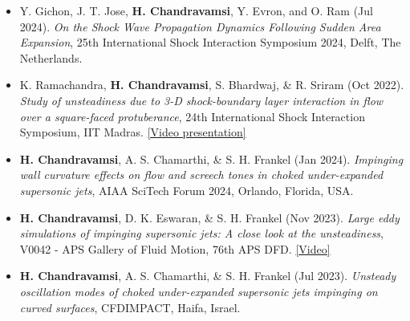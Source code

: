 \begin{itemize}[itemsep=0pt, topsep=0pt, label=]
    \item Y. Gichon, J. T. Jose, \textbf{H. Chandravamsi}, Y. Evron, and O. Ram (Jul 2024). \textit{On the Shock Wave Propagation Dynamics Following Sudden Area Expansion}, 25th International Shock Interaction Symposium 2024, Delft, The Netherlands.
\end{itemize}

\begin{itemize}[itemsep=0pt, topsep=0pt, label=]
    \item K. Ramachandra, \textbf{H. Chandravamsi}, S. Bhardwaj, \& R. Sriram (Oct 2022). \textit{Study of unsteadiness due to 3-D shock-boundary layer interaction in flow over a square-faced protuberance}, 24th International Shock Interaction Symposium, IIT Madras. \href{https://youtube.com/live/phs5VvR6Ksk?si=EnSIkaIECMiOmarE&t=9944}{[Video presentation]}
\end{itemize}

\begin{itemize}[itemsep=0pt, topsep=0pt, label=]
    \item \textbf{H. Chandravamsi}, A. S. Chamarthi, \& S. H. Frankel (Jan 2024). \textit{Impinging wall curvature effects on flow and screech tones in choked under-expanded supersonic jets}, AIAA SciTech Forum 2024, Orlando, Florida, USA.
\end{itemize}

\begin{itemize}[itemsep=0pt, topsep=0pt, label=]
    \item \textbf{H. Chandravamsi}, D. K. Eswaran, \& S. H. Frankel (Nov 2023). \textit{Large eddy simulations of impinging supersonic jets: A close look at the unsteadiness}, V0042 - APS Gallery of Fluid Motion, 76th APS DFD. \href{https://www.youtube.com/watch?v=B1hGOlWYCCA&t=7s}{[Video]}
\end{itemize}

\begin{itemize}[itemsep=0pt, topsep=0pt, label=]
    \item \textbf{H. Chandravamsi}, A. S. Chamarthi, \& S. H. Frankel (Jul 2023). \textit{Unsteady oscillation modes of choked under-expanded supersonic jets impinging on curved surfaces}, CFDIMPACT, Haifa, Israel.
\end{itemize}


